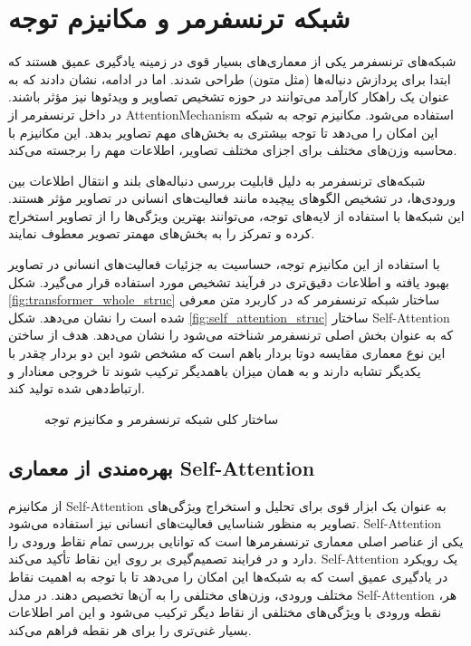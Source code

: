 \section{شبکه ترنسفرمر و مکانیزم توجه}

شبکه‌های ترنسفرمر یکی از معماری‌های بسیار قوی در زمینه یادگیری عمیق هستند که ابتدا برای پردازش دنباله‌ها (مثل متون) طراحی شدند.
\cite{AttentionIsAllNeed}
 اما در ادامه، نشان دادند که به عنوان یک راهکار کارآمد می‌توانند در حوزه تشخیص تصاویر و ویدئوها نیز مؤثر باشند. در داخل ترنسفرمر از %
\gls{AttentionMechanism}
استفاده می‌شود.
مکانیزم توجه به شبکه این امکان را می‌دهد تا توجه بیشتری به بخش‌های مهم تصاویر بدهد. این مکانیزم با محاسبه وزن‌های مختلف برای اجزای مختلف تصاویر، اطلاعات مهم را برجسته می‌کند. 

شبکه‌های ترنسفرمر به دلیل قابلیت بررسی دنباله‌های بلند و انتقال اطلاعات بین ورودی‌ها، در تشخیص الگوهای پیچیده مانند فعالیت‌های انسانی در تصاویر مؤثر هستند. این شبکه‌ها با استفاده از لایه‌های توجه، می‌توانند بهترین ویژگی‌ها را از تصاویر استخراج کرده و تمرکز را به بخش‌های مهمتر تصویر معطوف نمایند.

با استفاده از این مکانیزم توجه، حساسیت به جزئیات فعالیت‌های انسانی در تصاویر بهبود یافته و اطلاعات دقیق‌تری در فرآیند تشخیص مورد استفاده قرار می‌گیرد.
شکل%
\ref{fig:transformer_whole_struc}
 ساختار شبکه ترنسفرمر که در کاربرد متن معرفی شده است را نشان می‌دهد. شکل%
\ref{fig:self_attention_struc}
 ساختار
\gls{Self-Attention}
که به عنوان بخش اصلی ترنسفرمر شناخته می‌شود را نشان می‌دهد. هدف از ساختن این نوع معماری مقایسه دوتا بردار باهم است که مشخص شود این دو بردار چقدر با یکدیگر تشابه دارند و به همان میزان باهمدیگر ترکیب شوند تا خروجی معنادار و ارتباط‌دهی شده تولید کند.
\begin{figure}
	\centering
	
	\hfill
	
	\caption{ساختار کلی شبکه ترنسفرمر و مکانیزم توجه
		\cite{AttentionIsAllNeed}
	}
	\label{fig:mainfigure}
\end{figure}

\subsection{بهره‌مندی از معماری \gls{Self-Attention}}

از مکانیزم %
\gls{Self-Attention}
 به عنوان یک ابزار قوی برای تحلیل و استخراج ویژگی‌های تصاویر به منظور شناسایی فعالیت‌های انسانی نیز استفاده می‌شود.
\gls{Self-Attention}
یکی از عناصر اصلی معماری ترنسفرمرها است که توانایی بررسی تمام نقاط ورودی را دارد و در فرایند تصمیم‌گیری بر روی این نقاط تأکید می‌کند.
\gls{Self-Attention}
یک رویکرد در یادگیری عمیق است که به شبکه‌ها این امکان را می‌دهد تا با توجه به اهمیت نقاط مختلف ورودی، وزن‌های مختلفی را به آن‌ها تخصیص دهند.
در مدل %
\gls{Self-Attention}
،هر نقطه ورودی با ویژگی‌های مختلفی از نقاط دیگر ترکیب می‌شود و این امر اطلاعات بسیار غنی‌تری را برای هر نقطه فراهم می‌کند.

